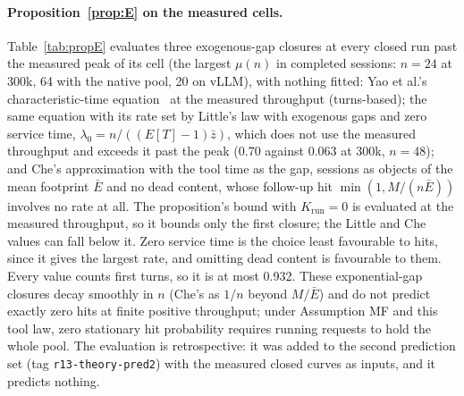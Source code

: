 \paragraph{Proposition~\ref{prop:E} on the measured cells.} Table~\ref{tab:propE} evaluates three exogenous-gap closures at every closed run past the measured peak of its cell (the largest $\mu(n)$ in completed sessions: $n=24$ at 300k, 64 with the native pool, 20 on vLLM), with nothing fitted: Yao et al.'s characteristic-time equation~\citep{yao2026multiturn} at the measured throughput (turns-based); the same equation with its rate set by Little's law with exogenous gaps and zero service time, $\lambda_0=n/((E[T]-1)\bar z)$, which does not use the measured throughput and exceeds it past the peak (0.70 against 0.063\sps{} at 300k, $n=48$); and Che's approximation with the tool time as the gap, sessions as objects of the mean footprint $\bar E$ and no dead content, whose follow-up hit $\min(1,M/(n\bar E))$ involves no rate at all. The proposition's bound with $K_{\mathrm{run}}=0$ is evaluated at the measured throughput, so it bounds only the first closure; the Little and Che values can fall below it. Zero service time is the choice least favourable to hits, since it gives the largest rate, and omitting dead content is favourable to them. Every value counts first turns, so it is at most 0.932. These exponential-gap closures decay smoothly in $n$ (Che's as $1/n$ beyond $M/\bar E$) and do not predict exactly zero hits at finite positive throughput; under Assumption MF and this tool law, zero stationary hit probability requires running requests to hold the whole pool. The evaluation is retrospective: it was added to the second prediction set (tag \texttt{r13-theory-pred2}) with the measured closed curves as inputs, and it predicts nothing.


